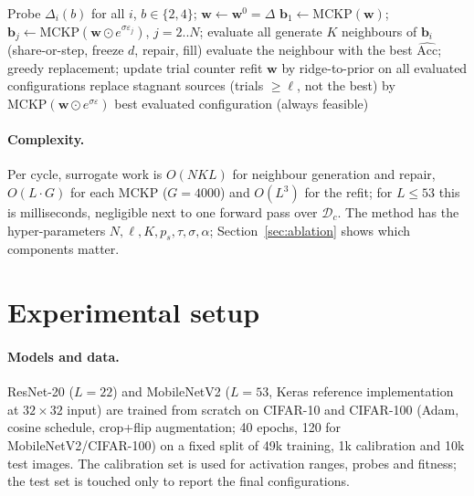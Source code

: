 \documentclass[11pt,a4paper]{article}
\begin{document}
\begin{algorithm}[t]
\caption{ABC-Q (budget $\beta$, evaluation budget $E$)}
\label{alg:abcq2}
\begin{algorithmic}[1]
\State Probe $\Delta_i(b)$ for all $i$, $b\in\{2,4\}$; $\mathbf w\gets\mathbf w^0=\Delta$ 
\State $\mathbf b_1\gets\mathrm{MCKP}(\mathbf w)$; $\mathbf b_j\gets\mathrm{MCKP}(\mathbf w\odot e^{\sigma\varepsilon_j})$, $j=2..N$; evaluate all
     \State generate $K$ neighbours of $\mathbf b_i$ (share-or-step, freeze $d$, repair, fill)
     \State evaluate the neighbour with the best $\widehat{\mathrm{Acc}}$; greedy replacement; update trial counter
  \EndFor
  \State refit $\mathbf w$ by ridge-to-prior on all evaluated configurations
  \State replace stagnant sources (trials $\ge\ell$, not the best) by $\mathrm{MCKP}(\mathbf w\odot e^{\sigma\varepsilon})$
\EndWhile
\State \Return best evaluated configuration (always feasible)
\end{algorithmic}
\end{algorithm}

\paragraph{Complexity.} Per cycle, surrogate work is $O(NKL)$ for neighbour generation and repair,
$O(L\cdot G)$ for each MCKP ($G=4000$) and $O(L^3)$ for the refit; for $L\le 53$ this is milliseconds,
negligible next to one forward pass over $\mathcal D_c$. The method has the hyper-parameters
$N,\ell,K,p_s,\tau,\sigma,\alpha$; Section~\ref{sec:ablation} shows which components matter.

\section{Experimental setup}
\label{sec:setup}

\paragraph{Models and data.} ResNet-20 \citep{He2016} ($L=22$) and MobileNetV2 \citep{Sandler2018}
($L=53$, Keras reference implementation at $32\times32$ input) are trained from scratch on CIFAR-10 and
CIFAR-100 \citep{Krizhevsky2009} (Adam, cosine schedule, crop+flip augmentation; 40 epochs, 120 for
MobileNetV2/CIFAR-100) on a fixed
split of 49k training, 1k calibration and 10k test images. The calibration set is used for activation
ranges, probes and fitness; the test set is touched only to report the final configurations.
\end{document}
